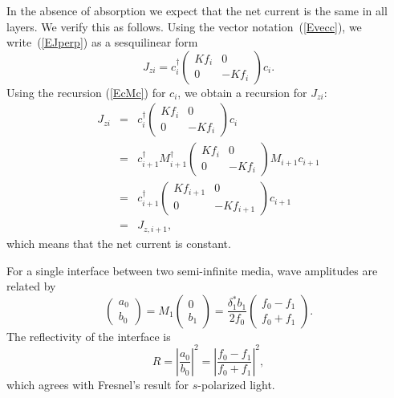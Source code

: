 In the absence of absorption we expect that the net current
is the same in all layers.
We verify this as follows.
Using the vector notation~(\ref{Evecc}),
we write~(\ref{EJperp}) as a sesquilinear form
\begin{equation}
  J_{zi}
  = c_i^\dagger \left(\begin{array}{cc}Kf_i&0\\0&-Kf_i\end{array}\right) c_i.
\end{equation}
Using the recursion (\ref{EcMc}) for $c_i$,
we obtain a recursion for $J_{zi}$:
\begin{equation}\label{EJrec}
  \begin{array}{lcl}
    J_{zi} &=&
    c_{i}^\dagger
    \left(\begin{array}{cc}Kf_{i}&0\\0&-Kf_{i}\end{array}\right) c_{i}
    \\[3ex]
    &=&
    c_{i+1}^\dagger M_{i+1}^\dagger
    \left(\begin{array}{cc}Kf_{i}&0\\0&-Kf_{i}\end{array}\right)
    M_{i+1}c_{i+1}
    \\[3ex]
    &=&
    c_{i+1}^\dagger
    \left(\begin{array}{cc}Kf_{i+1}&0\\0&-Kf_{i+1}\end{array}\right)
    c_{i+1}
    \\[3ex]
    &=&
    J_{z,i+1},
  \end{array}
\end{equation}
which means that the net current is constant.

For a single interface between two semi-infinite media,
wave amplitudes are related by
\begin{equation}
    \left(\begin{array}{c}a_0\\b_0\end{array}\right)
  = M_1
    \left(\begin{array}{c}0\\b_1\end{array}\right)
  = \frac{\delta_1^* b_1}{2 f_0}
    \left(\begin{array}{c}f_0-f_1\\f_0+f_1\end{array}\right).
\end{equation}
The reflectivity of the interface is
\begin{equation}\label{ER01}
  R={\left|\frac{a_0}{b_0}\right|}^2
   ={\left|\frac{f_0-f_1}{f_0+f_1}\right|}^2,
\end{equation}
which agrees with Fresnel's result for $s$-polarized light.


